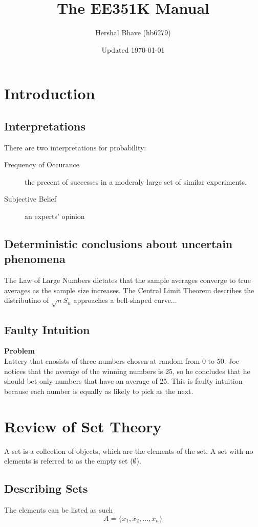 \documentclass[12pt]{book}
\title{The EE351K Manual}
\author{Hershal Bhave (hb6279)}
\date{Updated \today}
\newenvironment{Ex}{\vspace{1.5em}\hspace{-1.5em}\textbf{Problem}\\}{}
\begin{document}
\maketitle
\tableofcontents
\chapter{Introduction}
\section{Interpretations}
There are two interpretations for probability:
\begin{description}
\item[Frequency of Occurance] the precent of successes in a moderaly
  large set of similar experiments.
\item[Subjective Belief] an experts' opinion
\end{description}

\section{Deterministic conclusions about uncertain phenomena}
The Law of Large Numbers dictates that the sample averages converge to
true averages as the sample size increases. The Central Limit Theorem
describes the distributino of $\sqrt{n}S_n$ approaches a bell-shaped
curve...

\section{Faulty Intuition}
\begin{Ex}
  Lattery that cnosists of three numbers chosen at random from 0 to
  50. Joe notices that the average of the winning numbers is 25, so he
  concludes that he should bet only numbers that have an average of 25.
\end{Ex}
This is faulty intuition because each number is equally as likely to
pick as the next.

\chapter{Review of Set Theory}
A set is a collection of objects, which are the elements of the set. A
set with no elements is referred to as the empty set ($\emptyset$).
\section{Describing Sets}
The elements can be listed as such
$$A = \{x_1, x_2, \ldots, x_n\}$$
\end{document}
